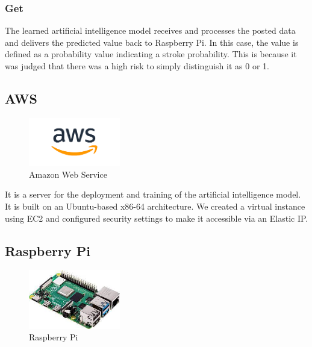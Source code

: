 \subsubsection{Get}
The learned artificial intelligence model receives and processes the posted data and delivers the predicted value back to Raspberry Pi. In this case, the value is defined as a probability value indicating a stroke probability. This is because it was judged that there was a high risk to simply distinguish it as 0 or 1.\\

\subsection{AWS}

\begin{figure}[htp]
\centering
\includegraphics[width=4cm]{images/aws.png}
\caption{Amazon Web Service}
\label{fig:aws}
\end{figure}

It is a server for the deployment and training of the artificial intelligence model. It is built on an Ubuntu-based x86-64 architecture. We created a virtual instance using EC2 and configured security settings to make it accessible via an Elastic IP.\\

\subsection{Raspberry Pi}

\begin{figure}[htp]
\centering
\includegraphics[width=4cm]{images/raspberrypi.jpeg}
\caption{Raspberry Pi}
\label{fig:raspberryPi}
\end{figure}

